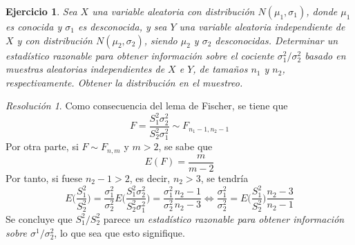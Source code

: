 \documentclass[11pt]{report}
\newtheorem{exercise}{Ejercicio}
\theoremstyle{remark}
\newtheorem*{resolution}{Resolución}
\begin{document}
\begin{exercise}
Sea $X$ una variable aleatoria con distribución $N(\mu_1,\sigma_1)$, donde $\mu_1$ es conocida y $\sigma_1$ es desconocida, y sea $Y$ una variable aleatoria independiente de $X$ y con distribución $N(\mu_2,\sigma_2)$, siendo $\mu_2$ y $\sigma_2$ desconocidas. Determinar un estadístico razonable para obtener información sobre el cociente $\sigma^2_1/\sigma^2_2$ basado en muestras aleatorias independientes de $X$ e $Y$, de tamaños $n_1$ y $n_2$, respectivamente. Obtener la distribución en el muestreo.
\end{exercise}

\begin{resolution}
Como consecuencia del lema de Fischer, se tiene que
\[F = \frac{S^2_1\sigma^2_2}{S^2_2\sigma^2_1} \sim F_{n_1-1,n_2-1}\]
Por otra parte, si $F \sim F_{n,m}$ y $m>2$, se sabe que
\[E(F) = \frac{m}{m-2}\]
Por tanto, si fuese $n_2-1>2$, es decir, $n_2>3$, se tendría
\[E\bigl(\frac{S^2_1}{S^2_2}\bigr) = \frac{\sigma^2_1}{\sigma^2_2} E\bigl(\frac{S^2_1\sigma^2_2}{S^2_2\sigma^2_1}\bigr) = \frac{\sigma^2_1}{\sigma^2_2}\frac{n_2-1}{n_2-3} \iff \frac{\sigma^2_1}{\sigma^2_2} = E\bigl(\frac{S^2_1}{S^2_2}\bigr)\frac{n_2-3}{n_2-1}\]
Se concluye que $S^2_1/S^2_2$ parece \textit{un estadístico razonable para obtener información sobre $\sigma^1/\sigma^2_2$}, lo que sea que esto signifique.
\end{resolution}
\end{document}
